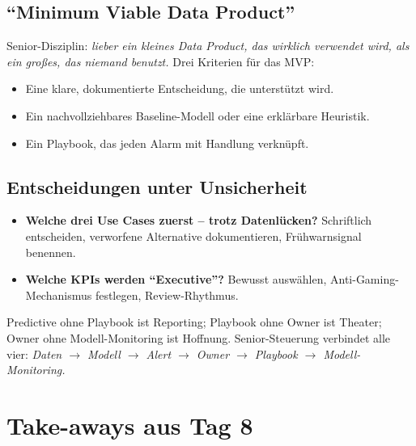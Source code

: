 \documentclass[11pt,a4paper,oneside]{article}
\begin{document}
\subsection{``Minimum Viable Data Product''}

Senior-Disziplin: \emph{lieber ein kleines Data Product, das wirklich verwendet wird, als ein großes, das niemand benutzt.} Drei Kriterien für das MVP:

\begin{itemize}
  \item Eine klare, dokumentierte Entscheidung, die unterstützt wird.
  \item Ein nachvollziehbares Baseline-Modell oder eine erklärbare Heuristik.
  \item Ein Playbook, das jeden Alarm mit Handlung verknüpft.
\end{itemize}

\subsection{Entscheidungen unter Unsicherheit}

\begin{itemize}
  \item \textbf{Welche drei Use Cases zuerst -- trotz Datenlücken?} Schriftlich entscheiden, verworfene Alternative dokumentieren, Frühwarnsignal benennen.
  \item \textbf{Welche KPIs werden ``Executive''?} Bewusst auswählen, Anti-Gaming-Mechanismus festlegen, Review-Rhythmus.
\end{itemize}

\begin{merkbox}
Predictive ohne Playbook ist Reporting; Playbook ohne Owner ist Theater; Owner ohne Modell-Monitoring ist Hoffnung. Senior-Steuerung verbindet alle vier: \emph{Daten $\rightarrow$ Modell $\rightarrow$ Alert $\rightarrow$ Owner $\rightarrow$ Playbook $\rightarrow$ Modell-Monitoring.}
\end{merkbox}

\section{Take-aways aus Tag 8}
\end{document}

